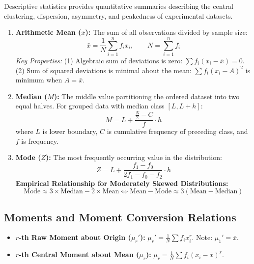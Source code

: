 \documentclass[12pt,a4paper]{article}
\begin{document}
Descriptive statistics provides quantitative summaries describing the central clustering, dispersion, asymmetry, and peakedness of experimental datasets.

\begin{tcolorbox}[defbox, title={\textbf{Definition: Measures of Central Tendency}}]
\begin{enumerate}[leftmargin=*, itemsep=2pt, topsep=2pt]
  \item \textbf{Arithmetic Mean ($\bar{x}$):} The sum of all observations divided by sample size:
  \begin{equation}
    \bar{x} = \frac{1}{N} \sum_{i=1}^n f_i x_i, \qquad N = \sum_{i=1}^n f_i
  \end{equation}
  \textit{Key Properties:} (1) Algebraic sum of deviations is zero: $\sum f_i (x_i - \bar{x}) = 0$. (2) Sum of squared deviations is minimal about the mean: $\sum f_i (x_i - A)^2$ is minimum when $A = \bar{x}$.
  \item \textbf{Median ($M$):} The middle value partitioning the ordered dataset into two equal halves. For grouped data with median class $[L, L+h]$:
  \begin{equation}
    M = L + \frac{\frac{N}{2} - C}{f} \cdot h
  \end{equation}
  where $L$ is lower boundary, $C$ is cumulative frequency of preceding class, and $f$ is frequency.
  \item \textbf{Mode ($Z$):} The most frequently occurring value in the distribution:
  \begin{equation}
    Z = L + \frac{f_1 - f_0}{2f_1 - f_0 - f_2} \cdot h
  \end{equation}
  \textbf{Empirical Relationship for Moderately Skewed Distributions:}
  \begin{equation}
    \text{Mode} \approx 3 \times \text{Median} - 2 \times \text{Mean} \iff \text{Mean} - \text{Mode} \approx 3(\text{Mean} - \text{Median})
  \end{equation}
\end{enumerate}
\end{tcolorbox}

\subsection{Moments and Moment Conversion Relations}
\begin{itemize}[leftmargin=*, itemsep=3pt]
  \item \textbf{$r$-th Raw Moment about Origin ($\mu_r'$):} $\mu_r' = \frac{1}{N} \sum f_i x_i^r$. Note: $\mu_1' = \bar{x}$.
  \item \textbf{$r$-th Central Moment about Mean ($\mu_r$):} $\mu_r = \frac{1}{N} \sum f_i (x_i - \bar{x})^r$.
\end{itemize}
\end{document}
